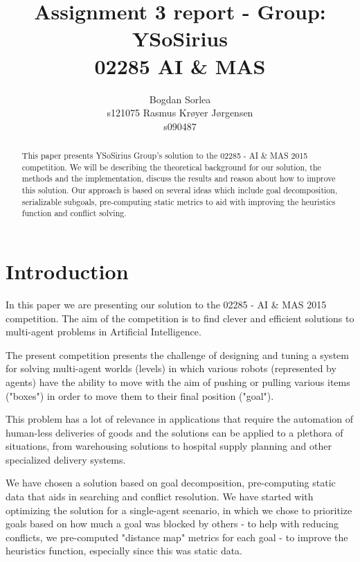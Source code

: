 \documentclass[letterpaper]{article}
\begin{document}
\title{Assignment 3 report - Group: YSoSirius \\ 02285 AI \& MAS}
\author{Bogdan Sorlea \\ s121075 \And Rasmus Kr{\o}yer J{\o}rgensen \\ s090487}
\maketitle
\begin{abstract}
This paper presents YSoSirius Group's solution to the 02285 - AI \& MAS 2015 competition. We will be describing the theoretical background for our solution, the methods and the implementation, discuss the results and reason about how to improve this solution. Our approach is based on several ideas which include goal decomposition, serializable subgoals, pre-computing static metrics to aid with improving the heuristics function and conflict solving.
\end{abstract}

\section{Introduction}
In this paper we are presenting our solution to the 02285 - AI \& MAS 2015 competition. The aim of the competition is to find clever and efficient solutions to multi-agent problems in Artificial Intelligence.

The present competition presents the challenge of designing and tuning a system for solving multi-agent worlds (levels) in which various robots (represented by agents) have the ability to move with the aim of pushing or pulling various items ("boxes") in order to move them to their final position ("goal").

This problem has a lot of relevance in applications that require the automation of human-less deliveries of goods and the solutions can be applied to a plethora of situations, from warehousing solutions to hospital supply planning and other specialized delivery systems.

We have chosen a solution based on goal decomposition, pre-computing static data that aids in searching and conflict resolution. We have started with optimizing the solution for a single-agent scenario, in which we chose to prioritize goals based on how much a goal was blocked by others - to help with reducing conflicts, we pre-computed "distance map" metrics for each goal - to improve the heuristics function, especially since this was static data. 
\end{document}
